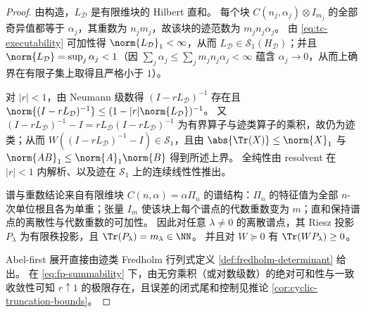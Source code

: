 \begin{proof}
由构造，\(L_{\mathcal D}\) 是有限维块的 Hilbert 直和。
每个块 \(C(n_j,\alpha_j)\otimes I_{m_j}\) 的全部奇异值都等于 \(\alpha_j\)，其重数为 \(n_jm_j\)，故该块的迹范数为 \(m_jn_j\alpha_j\)。
由 \eqref{eq:tc-executability} 可加性得 \(\norm{L_{\mathcal D}}_1<\infty\)，从而 \(L_{\mathcal D}\in\mathcal{S}_1(H_{\mathcal D})\)；并且 \(\norm{L_{\mathcal D}}=\sup_j\alpha_j<1\)（因 \(\sum_j\alpha_j\le\sum_j m_jn_j\alpha_j<\infty\) 蕴含 \(\alpha_j\to 0\)，从而上确界在有限子集上取得且严格小于 \(1\)）。

对 \(|r|<1\)，由 Neumann 级数得 \((I-rL_{\mathcal D})^{-1}\) 存在且
\(
\norm{(I-rL_{\mathcal D})^{-1}}\le (1-|r|\norm{L_{\mathcal D}})^{-1}
\)。
又 \((I-rL_{\mathcal D})^{-1}-I=rL_{\mathcal D}(I-rL_{\mathcal D})^{-1}\) 为有界算子与迹类算子的乘积，故仍为迹类；从而 \(W((I-rL_{\mathcal D})^{-1}-I)\in\mathcal{S}_1\)，且由 \(\abs{\Tr(X)}\le \norm{X}_1\) 与 \(\norm{AB}_1\le \norm{A}_1\norm{B}\) 得到所述上界。
全纯性由 resolvent 在 \(|r|<1\) 内解析、以及迹在 \(\mathcal{S}_1\) 上的连续线性性推出。

谱与重数结论来自有限维块 \(C(n,\alpha)=\alpha\Pi_n\) 的谱结构：\(\Pi_n\) 的特征值为全部 \(n\)-次单位根且各为单重；张量 \(I_{m}\) 使该块上每个谱点的代数重数变为 \(m\)；直和保持谱点的离散性与代数重数的可加性。
因此对任意 \(\lambda\ne 0\) 的离散谱点，其 Riesz 投影 \(P_\lambda\) 为有限秩投影，且 \(\Tr(P_\lambda)=m_\lambda\in\NN\)。
并且对 \(W\succeq 0\) 有 \(\Tr(WP_\lambda)\ge 0\)。

Abel-first 展开直接由迹类 Fredholm 行列式定义 \ref{def:fredholm-determinant} 给出。
在 \eqref{eq:fp-summability} 下，由无穷乘积（或对数级数）的绝对可和性与一致收敛性可知 \(r\uparrow 1\) 的极限存在，且误差的闭式尾和控制见推论 \ref{cor:cyclic-truncation-bounds}。
\end{proof}

